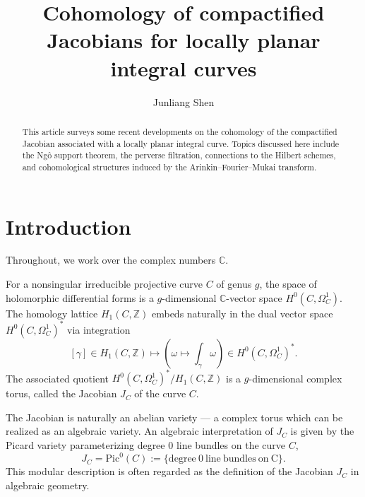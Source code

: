 \documentclass{pspum-l}
\title[Cohomology of compactified Jacobians]{Cohomology of compactified Jacobians for locally planar integral curves}
\author[J. Shen]{Junliang Shen}
\theoremstyle{plain}
\theoremstyle{definition}
\theoremstyle{remark}
\newcommand{\BC}{{\mathbb{C}}}
\newcommand{\BZ}{{\mathbb{Z}}}
\begin{document}
\begin{abstract}
This article surveys some recent developments on the cohomology of the compactified Jacobian associated with a locally planar integral curve. Topics discussed here include the Ng\^o support theorem, the perverse filtration, connections to the Hilbert schemes, and cohomological structures induced by the Arinkin--Fourier--Mukai transform.
\end{abstract}

\maketitle





\setcounter{section}{-1}

\section{Introduction}

Throughout, we work over the complex numbers $\BC$. 

For a nonsingular irreducible projective curve $C$ of genus $g$, the space of holomorphic differential forms is a $g$-dimensional $\BC$-vector space $H^0(C, \Omega^1_C)$. The homology lattice $H_1(C,\BZ)$ embeds naturally in the dual vector space $H^0(C, \Omega^1_C)^\ast$ via integration
\[
[\gamma] \in H_1(C,\BZ) \mapsto \left(\omega  \mapsto \int_{\gamma} \omega \right) \in H^0(C, \Omega_C^1)^\ast.
\]
The associated quotient $H^0(C, \Omega^1_C)^*/H_1(C, \BZ)$ is a $g$-dimensional complex torus, called the Jacobian $J_C$ of the curve $C$. 

The Jacobian is naturally an abelian variety --- a complex torus which can be realized as an algebraic variety. An algebraic interpretation of $J_C$ is given by the Picard variety parameterizing degree 0 line bundles on the curve $C$,
\[
J_C = \mathrm{Pic}^0(C):=\{\mathrm{degree~0~ line~ bundles~ on~ C}\}.
\]
This modular description is often regarded as the definition of the Jacobian $J_C$ in algebraic geometry.
\end{document}
